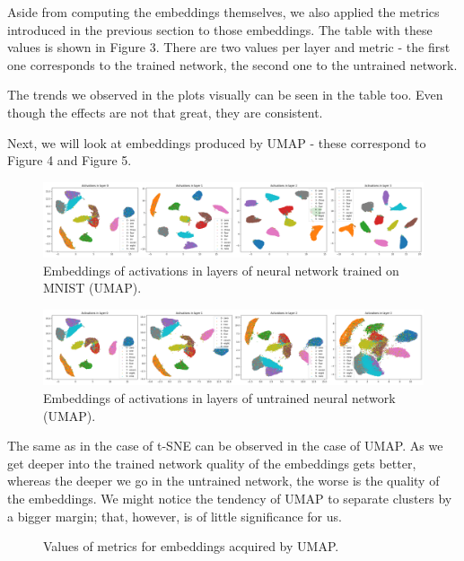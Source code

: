 \documentclass{article}
\begin{document}
Aside from computing the embeddings themselves, we also applied the metrics
introduced in the previous section to those embeddings. The table with these
values is shown in Figure 3. There are two values per layer and metric - the
first one corresponds to the trained network, the second one to the untrained
network.

The trends we observed in the plots visually can be seen in the table too. Even
though the effects are not that great, they are consistent.

Next, we will look at embeddings produced by UMAP - these correspond
to Figure 4 and Figure 5.

\begin{figure}
  \centering
    \includegraphics[width=1.0\textwidth]{../../out/activations_feedforward/mnist_umap_trained.png}
  \caption{Embeddings of activations in layers of neural network trained on MNIST (UMAP).}
\end{figure}

\begin{figure}
  \centering
    \includegraphics[width=1.0\textwidth]{../../out/activations_feedforward/mnist_umap_untrained.png}
  \caption{Embeddings of activations in layers of untrained neural network (UMAP).}
\end{figure}

The same as in the case of t-SNE can be observed in the case of UMAP. As we get
deeper into the trained network quality of the embeddings gets better, whereas
the deeper we go in the untrained network, the worse is the quality of the
embeddings. We might notice the tendency of UMAP to separate clusters by
a bigger margin; that, however, is of little significance for us.

\begin{figure}
  \centering
    \resizebox{\textwidth}{!}{
        
    }
  \caption{Values of metrics for embeddings acquired by UMAP.}
\end{figure}
\end{document}

